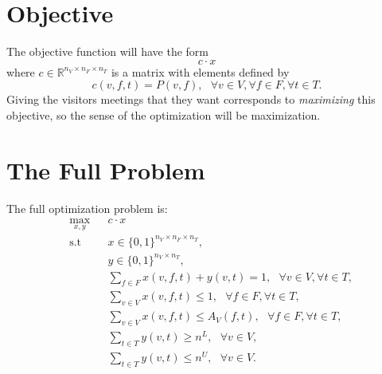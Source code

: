 \documentclass[12pt]{article}
\newcommand{\R}{\mathbb R}
\theoremstyle{definition}
\newtheorem{definition set}{Definition Set}%
\newtheorem{problem statement}{Problem Statement} %
\theoremstyle{remark}
\theoremstyle{remark}
\begin{document}
\section{Objective}
The objective function will have the form
\begin{equation}
c\cdot x
\end{equation}
where $c \in \R^{n_V \times n_F \times n_T}$ is a matrix with elements defined by
\begin{equation}
c(v,f,t) = P(v,f), \ \ \ \forall v \in V, \forall f \in F, \forall t \in T.
\end{equation}
Giving the visitors meetings that they want corresponds to \emph{maximizing} this objective, so the sense of the optimization will be maximization.

\section{The Full Problem}
The full optimization problem is:
\begin{equation}
\begin{aligned}
&\max_{x,y} && c \cdot x \\
&\text{s.t} && x \in \{0,1\}^{n_V \times n_F \times n_T}, \\
& && y \in \{0,1\}^{n_V \times n_T}, \\
& && \sum_{f \in F} x(v,f,t) + y(v,t) = 1, \ \ \ \forall v \in V, \forall t \in T, \\
& && \sum_{v \in V} x(v,f,t) \leq 1, \ \ \ \forall f \in F, \forall t \in T, \\
& && \sum_{v \in V} x(v,f,t) \leq A_V(f,t), \ \ \ \forall f \in F, \forall t \in T, \\
& && \sum_{t \in T} y(v,t) \geq n^L, \ \ \ \forall v \in V, \\
& && \sum_{t \in T} y(v,t) \leq n^U, \ \ \ \forall v \in V.
\end{aligned}
\end{equation}
\end{document}

